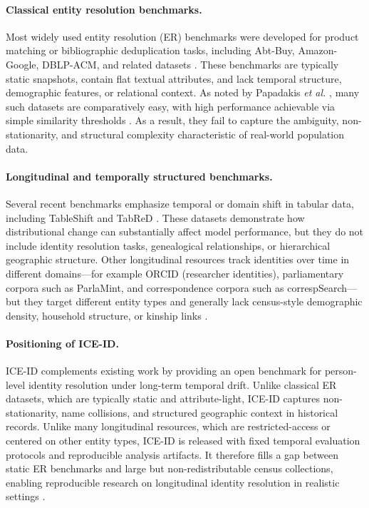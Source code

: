 \documentclass{article}
\begin{document}
\paragraph{Classical entity resolution benchmarks.}
Most widely used entity resolution (ER) benchmarks were developed for product matching or bibliographic deduplication tasks, including Abt-Buy, Amazon-Google, DBLP-ACM, and related datasets \cite{mudgal2018deep, Kpcke2010EvaluationOE}. These benchmarks are typically static snapshots, contain flat textual attributes, and lack temporal structure, demographic features, or relational context. As noted by Papadakis \emph{et al.} \cite{papadakis2023}, many such datasets are comparatively easy, with high performance achievable via simple similarity thresholds \cite{papadakis2023, Li2020DeepEM, Papadakis2019ASO}. As a result, they fail to capture the ambiguity, non-stationarity, and structural complexity characteristic of real-world population data.

\paragraph{Longitudinal and temporally structured benchmarks.}
Several recent benchmarks emphasize temporal or domain shift in tabular data, including TableShift \cite{gardner2023tableshift} and TabReD \cite{rubachev2024tabred}. These datasets demonstrate how distributional change can substantially affect model performance, but they do not include identity resolution tasks, genealogical relationships, or hierarchical geographic structure. Other longitudinal resources track identities over time in different domains---for example ORCID (researcher identities), parliamentary corpora such as ParlaMint, and correspondence corpora such as correspSearch---but they target different entity types and generally lack census-style demographic density, household structure, or kinship links \cite{orcid_about,orcid_public_data,erjavec2022parlamint,mueller2017correspsearch}.

\paragraph{Positioning of ICE-ID.}
ICE-ID complements existing work by providing an open benchmark for person-level identity resolution under long-term temporal drift. Unlike classical ER datasets, which are typically static and attribute-light, ICE-ID captures non-stationarity, name collisions, and structured geographic context in historical records. Unlike many longitudinal resources, which are restricted-access or centered on other entity types, ICE-ID is released with fixed temporal evaluation protocols and reproducible analysis artifacts. It therefore fills a gap between static ER benchmarks and large but non-redistributable census collections, enabling reproducible research on longitudinal identity resolution in realistic settings \cite{magellan}.
\end{document}
